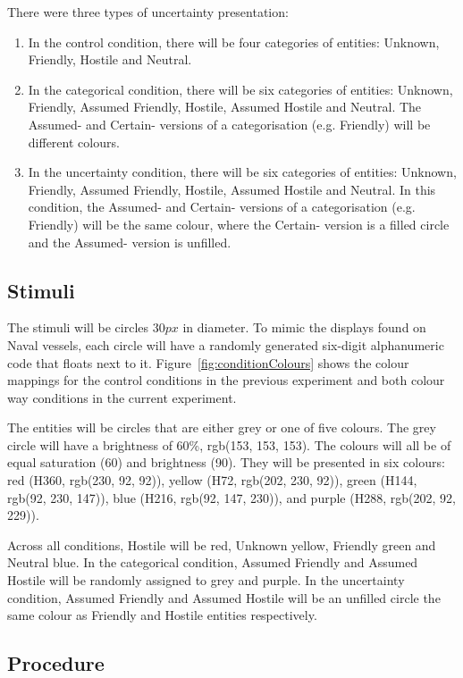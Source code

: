 \documentclass[doc, a4paper, apacite]{apa6}
\begin{document}
There were three types of uncertainty presentation:
\begin{enumerate}
	\item In the control condition, there will be four categories of entities: Unknown, Friendly, Hostile and Neutral.\\
	\item In the categorical condition, there will be six categories of entities: Unknown, Friendly, Assumed Friendly, Hostile, Assumed Hostile and Neutral. The Assumed- and Certain- versions of a categorisation (e.g. Friendly) will be different colours. 
	\item In the uncertainty condition, there will be six categories of entities: Unknown, Friendly, Assumed Friendly, Hostile, Assumed Hostile and Neutral. In this condition, the Assumed- and Certain- versions of a categorisation (e.g. Friendly) will be the same colour, where the Certain- version is a filled circle and the Assumed- version is unfilled. 
\end{enumerate}

\subsection{Stimuli}
The stimuli will be circles $30px$ in diameter. 
To mimic the displays found on Naval vessels, each circle will have a randomly generated six-digit alphanumeric code that floats next to it. 
Figure~\ref{fig:conditionColours} shows the colour mappings for the control conditions in the previous experiment and both colour way conditions in the current experiment. 

The entities will be circles that are either grey or one of five colours. 
The grey circle will have a brightness of 60\%, rgb(153, 153, 153). 
The colours will all be of equal saturation (60) and brightness (90). 
They will be presented in six colours: red (H360, rgb(230, 92, 92)), yellow (H72, rgb(202, 230, 92)), green (H144, rgb(92, 230, 147)), blue (H216, rgb(92, 147, 230)), and purple (H288, rgb(202, 92, 229)).

Across all conditions, Hostile will be red, Unknown yellow, Friendly green and Neutral blue. 
In the categorical condition, Assumed Friendly and Assumed Hostile will be randomly assigned to grey and purple. 
In the uncertainty condition, Assumed Friendly and Assumed Hostile will be an unfilled circle the same colour as Friendly and Hostile entities respectively. 

\subsection{Procedure}
\end{document}
